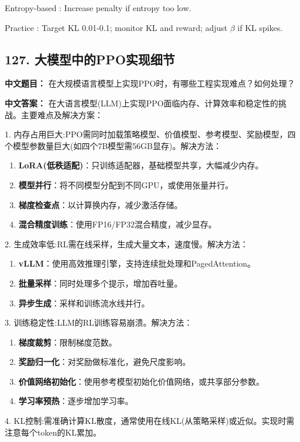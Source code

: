 \documentclass[10pt,a4paper]{ctexart}
\begin{document}
Entropy-based : Increase penalty if entropy too low.

Practice : Target KL 0.01-0.1; monitor KL and reward; adjust \(\beta\) if KL spikes.

\subsection*{127. 大模型中的PPO实现细节}
\textbf{中文题目：} 在大规模语言模型上实现PPO时，有哪些工程实现难点？如何处理？

\textbf{中文答案：}  
在大语言模型(LLM)上实现PPO面临内存、计算效率和稳定性的挑战。主要难点及解决方案：

1.  内存占用巨大:PPO需同时加载策略模型、价值模型、参考模型、奖励模型，四个模型参数量巨大(如四个7B模型需56GB显存)。解决方法：
\begin{enumerate}
       \item \textbf{LoRA(低秩适配)}：只训练适配器，基础模型共享，大幅减少内存。
       \item \textbf{模型并行}：将不同模型分配到不同GPU，或使用张量并行。
       \item \textbf{梯度检查点}：以计算换内存，减少激活存储。
       \item \textbf{混合精度训练}：使用FP16/FP32混合精度，减少显存。
\end{enumerate}

2.  生成效率低:RL需在线采样，生成大量文本，速度慢。解决方法：
\begin{enumerate}
       \item \textbf{vLLM}：使用高效推理引擎，支持连续批处理和PagedAttention。
       \item \textbf{批量采样}：同时处理多个提示，增加吞吐量。
       \item \textbf{异步生成}：采样和训练流水线并行。
\end{enumerate}

3.  训练稳定性:LLM的RL训练容易崩溃。解决方法：
\begin{enumerate}
       \item \textbf{梯度裁剪}：限制梯度范数。
       \item \textbf{奖励归一化}：对奖励做标准化，避免尺度影响。
       \item \textbf{价值网络初始化}：使用参考模型初始化价值网络，或共享部分参数。
       \item \textbf{学习率预热}：逐步增加学习率。
\end{enumerate}

4.  KL控制:需准确计算KL散度，通常使用在线KL(从策略采样)或近似。实现时需注意每个token的KL累加。
\end{document}
